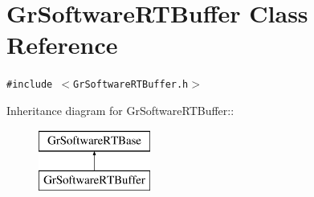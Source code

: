 \hypertarget{class_gr_software_r_t_buffer}{
\section{GrSoftwareRTBuffer Class Reference}
\label{class_gr_software_r_t_buffer}
}
{\tt \#include $<$GrSoftwareRTBuffer.h$>$}

Inheritance diagram for GrSoftwareRTBuffer::\begin{figure}[H]
\begin{center}
\leavevmode
\includegraphics[height=2cm]{class_gr_software_r_t_buffer}
\end{center}
\end{figure}
